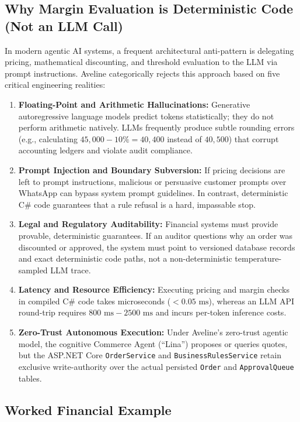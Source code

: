 \subsection{Why Margin Evaluation is Deterministic Code (Not an LLM Call)}

In modern agentic AI systems, a frequent architectural anti-pattern is delegating pricing, mathematical discounting, and threshold evaluation to the LLM via prompt instructions. Aveline categorically rejects this approach based on five critical engineering realities:

\begin{enumerate}
    \item \textbf{Floating-Point and Arithmetic Hallucinations:} Generative autoregressive language models predict tokens statistically; they do not perform arithmetic natively. LLMs frequently produce subtle rounding errors (e.g., calculating $45,000 - 10\% = 40,400$ instead of $40,500$) that corrupt accounting ledgers and violate audit compliance.
    \item \textbf{Prompt Injection and Boundary Subversion:} If pricing decisions are left to prompt instructions, malicious or persuasive customer prompts over WhatsApp can bypass system prompt guidelines. In contrast, deterministic C\# code guarantees that a rule refusal is a hard, impassable stop.
    \item \textbf{Legal and Regulatory Auditability:} Financial systems must provide provable, deterministic guarantees. If an auditor questions why an order was discounted or approved, the system must point to versioned database records and exact deterministic code paths, not a non-deterministic temperature-sampled LLM trace.
    \item \textbf{Latency and Resource Efficiency:} Executing pricing and margin checks in compiled C\# code takes microseconds ($< 0.05 \text{ ms}$), whereas an LLM API round-trip requires $800 \text{ ms} - 2500 \text{ ms}$ and incurs per-token inference costs.
    \item \textbf{Zero-Trust Autonomous Execution:} Under Aveline's zero-trust agentic model, the cognitive Commerce Agent (``Lina'') proposes or queries quotes, but the ASP.NET Core \texttt{OrderService} and \texttt{BusinessRulesService} retain exclusive write-authority over the actual persisted \texttt{Order} and \texttt{ApprovalQueue} tables.
\end{enumerate}

\subsection{Worked Financial Example}

